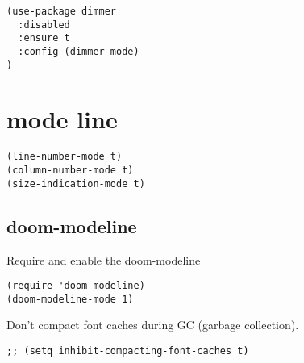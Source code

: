\documentclass[11pt]{article}
\begin{document}
\begin{verbatim}
(use-package dimmer
  :disabled
  :ensure t
  :config (dimmer-mode)
)
\end{verbatim}

\section*{mode line}
\label{sec:orgf655e29}
\begin{verbatim}
(line-number-mode t)
(column-number-mode t)
(size-indication-mode t)
\end{verbatim}

\subsection*{doom-modeline}
\label{sec:org6b38f26}

Require and enable the doom-modeline
\begin{verbatim}
(require 'doom-modeline)
(doom-modeline-mode 1)
\end{verbatim}

Don’t compact font caches during GC (garbage collection).
\begin{verbatim}
;; (setq inhibit-compacting-font-caches t)
\end{verbatim}
\end{document}
